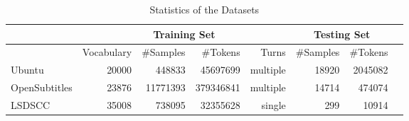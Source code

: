 \begin{table}[H]
    \centering
    \caption{Statistics of the Datasets}
    \label{tab:dataset_stats}
    \begin{tabular}{|l|*{7}{r|}}
        \hline
        & \multicolumn{4}{c|}{Training Set} & \multicolumn{2}{c|}{Testing Set} \\
        \hline
        & Vocabulary & \#Samples & \#Tokens & Turns & \#Samples & \#Tokens \\
        \hline
        Ubuntu & 20000 & 448833 & 45697699 & multiple & 18920 & 2045082   \\
        \hline
        OpenSubtitles & 23876 & 11771393 & 379346841 & multiple & 14714 & 474074 \\
        \hline
        LSDSCC & 35008 & 738095 & 32355628 & single & 299 & 10914 \\
        \hline
    \end{tabular}
\end{table}